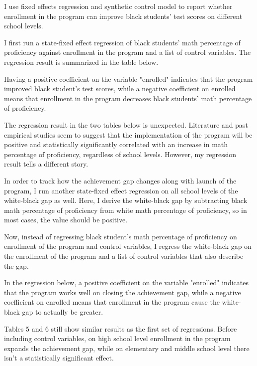 I use fixed effects regression and synthetic control model to report whether enrollment in the program can improve black students' test scores on different school levels. 

I first run a state-fixed effect regression of black students' math percentage of proficiency against enrollment in the program and a list of control variables. The regression result is summarized in the table below. 

Having a positive coefficient on the variable "enrolled" indicates that the program improved black student's test scores, while a negative coefficient on enrolled means that enrollment in the program decreases black students' math percentage of proficiency.

The regression result in the two tables below is unexpected. Literature and past empirical studies seem to suggest that the implementation of the program will be positive and statistically significantly correlated with an increase in math percentage of proficiency, regardless of school levels. However, my regression result tells a different story. 





In order to track how the achievement gap changes along with launch of the program, I run another state-fixed effect regression on all school levels of the white-black gap as well. Here, I derive the white-black gap by subtracting black math percentage of proficiency from white math percentage of proficiency, so in most cases, the value should be positive. 

Now, instead of regressing black student's math percentage of proficiency on enrollment of the program and control variables, I regress the white-black gap on the enrollment of the program and a list of control variables that also describe the gap. 

In the regression below, a positive coefficient on the variable "enrolled" indicates that the program works well on closing the achievement gap, while a negative coefficient on enrolled means that enrollment in the program cause the white-black gap to actually be greater.

Tables 5 and 6 still show similar results as the first set of regressions. Before including control variables, on high school level enrollment in the program expands the achievement gap, while on elementary and middle school level there isn't a statistically significant effect.



